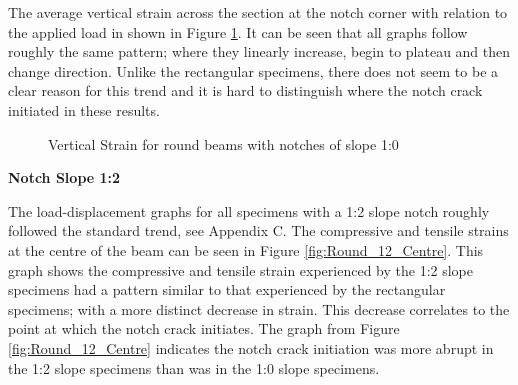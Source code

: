 \documentclass[11pt,a4paper]{article}
\numberwithin{equation}{subsection}
\begin{document}
\noindent
The average vertical strain across the section at the notch corner with relation to the applied load in shown in Figure \ref{fig:Round_10_Y}. It can be seen that all graphs follow roughly the same pattern; where they linearly increase, begin to plateau and then change direction. Unlike the rectangular specimens, there does not seem to be a clear reason for this trend and it is hard to distinguish where the notch crack initiated in these results. 

\vspace*{\baselineskip}

\begin{figure}[h]
	\begin{center}
	\end{center}
	\caption{Vertical Strain for round beams with notches of slope 1:0}
	\label{fig:Round_10_Y}
\end{figure}

\vspace*{\baselineskip}

\noindent
\textbf{Notch Slope 1:2}\par
\noindent
The load-displacement graphs for all specimens with a 1:2 slope notch roughly followed the standard trend, see Appendix C. The compressive and tensile strains at the centre of the beam can be seen in Figure \ref{fig:Round_12_Centre}. This graph shows the compressive and tensile strain experienced by the 1:2 slope specimens had a pattern similar to that experienced by the rectangular specimens; with a more distinct decrease in strain. This decrease correlates to the point at which the notch crack initiates. The graph from Figure \ref{fig:Round_12_Centre} indicates the notch crack initiation was more abrupt in the 1:2 slope specimens than was in the 1:0 slope specimens.
\end{document}
